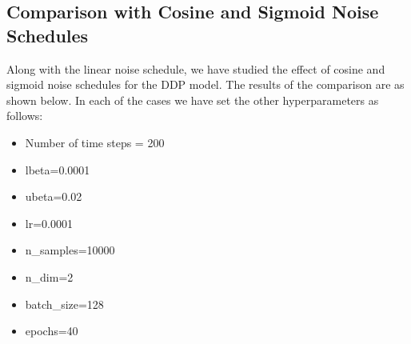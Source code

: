 \documentclass[a4paper,12pt]{article}
\begin{document}
\subsection*{Comparison with Cosine and Sigmoid Noise Schedules}
Along with the linear noise schedule, we have studied the effect of cosine and sigmoid noise schedules for the DDP model. The results of the comparison are as shown below. In each of the cases we have set the other hyperparameters as follows:
\begin{itemize}
  \item Number of time steps = 200
  \item lbeta=0.0001
  \item ubeta=0.02
  \item lr=0.0001
  \item n\_samples=10000
  \item n\_dim=2
  \item batch\_size=128
  \item epochs=40
\end{itemize}
\end{document}
